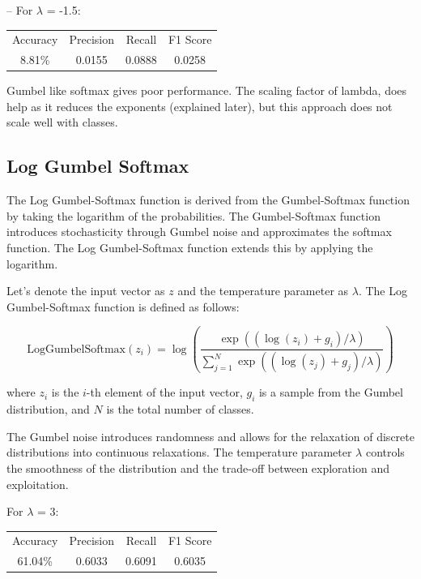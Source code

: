 \documentclass{article}
\begin{document}
--
\vspace{6pt}
For \(\lambda\) = -1.5:

\begin{center}
\begin{tabular}{ |c|c|c|c| } 
 \hline
 Accuracy & Precision & Recall & F1 Score \\ 
 8.81\% & 0.0155 & 0.0888 & 0.0258 \\
 \hline
\end{tabular}
\end{center}

Gumbel like softmax gives poor performance. The scaling factor of lambda, does help as it reduces the exponents (explained later), but this approach does not scale well with classes.



\subsection{Log Gumbel Softmax}

The Log Gumbel-Softmax function is derived from the Gumbel-Softmax function by taking the logarithm of the probabilities. The Gumbel-Softmax function introduces stochasticity through Gumbel noise and approximates the softmax function. The Log Gumbel-Softmax function extends this by applying the logarithm.

Let's denote the input vector as \(z\) and the temperature parameter as \(\lambda\). The Log Gumbel-Softmax function is defined as follows:

\[
\text{LogGumbelSoftmax}(z_i) = \log\left(\frac{\exp((\log(z_i) + g_i)/\lambda)}{\sum_{j=1}^{N}\exp((\log(z_j) + g_j)/\lambda)}\right)
\]

where \(z_i\) is the \(i\)-th element of the input vector, \(g_i\) is a sample from the Gumbel distribution, and \(N\) is the total number of classes.

The Gumbel noise introduces randomness and allows for the relaxation of discrete distributions into continuous relaxations. The temperature parameter \(\lambda\) controls the smoothness of the distribution and the trade-off between exploration and exploitation.

\vspace{6pt}
For \(\lambda\) = 3:

\begin{center}
\begin{tabular}{ |c|c|c|c| } 
 \hline
 Accuracy & Precision & Recall & F1 Score \\ 
 61.04\% & 0.6033 & 0.6091 & 0.6035 \\
 \hline
\end{tabular}
\end{center}
\end{document}
